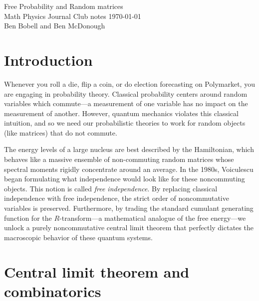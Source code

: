 \documentclass[11pt]{article}
\theoremstyle{definition}
\begin{document}
\noindent\huge{Free Probability and Random matrices}\normalsize \\
\large{Math Physics Journal Club notes} \hfill \today\\
Ben Bobell and Ben McDonough

\section{Introduction}
Whenever you roll a die, flip a coin, or do election forecasting on Polymarket, you are engaging in probability theory. Classical probability centers around random variables which commute---a measurement of one variable has no impact on the measurement of another. However, quantum mechanics violates this classical intuition, and so we need our probabilistic theories to work for random objects (like matrices) that do not commute. 

The energy levels of a large nucleus are best described by the Hamiltonian, which behaves like a massive ensemble of non-commuting random matrices whose spectral moments rigidly concentrate around an average. 
In the 1980s, Voiculescu began formulating what independence would look like for these noncommuting objects. This notion is called \textit{free independence}.
By replacing classical independence with free independence, the strict order of noncommutative variables is preserved. Furthermore, by trading the standard cumulant generating function for the $R$-transform---a mathematical analogue of the free energy---we unlock a purely noncommutative central limit theorem that perfectly dictates the macroscopic behavior of these quantum systems.

\section{Central limit theorem and combinatorics} 
\end{document}
